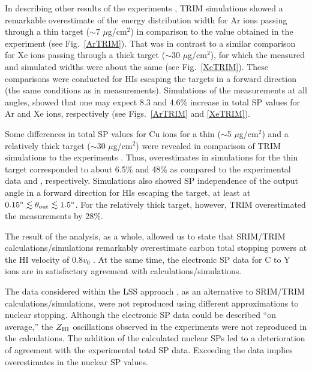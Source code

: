 \documentclass[aps,pra,twocolumn,amsmath,amssymb,floatfix]{revtex4-2}
\begin{document}
In describing other results of the experiments \cite{Fastrup66,Hvelp68,Lennard86}, TRIM simulations showed a remarkable overestimate of the energy distribution width for Ar ions passing through a thin target ($\sim$7 $\mu$g/cm$^{2}$) in comparison to the value obtained in the experiment \cite{Fastrup66} (see Fig.~\ref{ArTRIM}).  That was in contrast to a similar comparison for Xe ions passing through a thick target ($\sim$30 $\mu$g/cm$^{2}$), for which the measured \cite{Lennard86} and simulated widths were about the same (see Fig.~\ref{XeTRIM}). These comparisons were conducted for HIs escaping the targets in a forward direction (the same conditions as in measurements). Simulations of the measurements at all angles, showed that one may expect 8.3 and 4.6\% increase in total SP values for Ar and Xe ions, respectively (see Figs.~\ref{ArTRIM} and \ref{XeTRIM}).

Some differences in total SP values for Cu ions for a thin ($\sim$5 $\mu$g/cm$^{2}$) and a relatively thick target ($\sim$30 $\mu$g/cm$^{2}$) were revealed in comparison of TRIM simulations to the experiments \cite{Hvelp68,Lennard86}. Thus, overestimates in simulations for the thin target corresponded to about 6.5\% and 48\% as compared to the experimental data \cite{Hvelp68} and \cite{Lennard86}, respectively. Simulations also showed SP independence of the output angle in a forward direction for HIs escaping the target, at least at $ 0.15^{\circ} \lesssim \theta_{\rm out} \lesssim 1.5^{\circ}$. For the relatively thick target, however, TRIM overestimated the measurements \cite{Lennard86} by 28\%.

The result of the analysis, as a whole, allowed us to state that SRIM/TRIM calculations/simulations remarkably overestimate carbon total stopping powers at the HI velocity of $0.8 v_{0}$ \cite{Lennard86}. At the same time, the electronic SP data for C to Y ions \cite{Fastrup66,Hvelp68} are in satisfactory agreement with calculations/simulations.

The data \cite{Fastrup66,Hvelp68,Lennard86} considered within the LSS approach \cite{LSS63}, as an alternative to SRIM/TRIM calculations/simulations, were not reproduced using different approximations to nuclear stopping. Although the electronic SP data could be described ``on average,'' the $Z_{\rm HI}$ oscillations observed in the experiments \cite{Fastrup66,Hvelp68,Lennard86} were not reproduced in the calculations. The addition of the calculated nuclear SPs \cite{Ziegler77} led to a deterioration of agreement with the experimental total SP data. Exceeding the data implies overestimates in the nuclear SP values.
\end{document}
